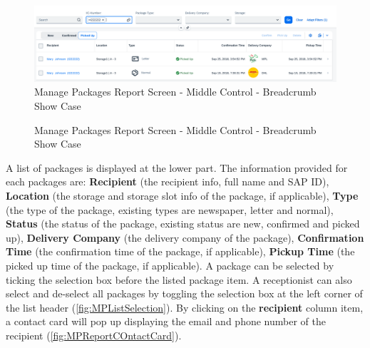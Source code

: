 \begin{figure}[H]
	\centering
	\includegraphics[width=1\linewidth]{images/user_doc/managePack/ReportScreen/browse/defaultFreeTextIdUsage.png}
	\caption{Manage Packages Report Screen - Middle Control - Breadcrumb Show Case}
	\label{fig:MPbreadcrumbShowCase}
\end{figure}


\begin{figure}[H]
	\centering
	\hspace{5pt}

	\caption{Manage Packages Report Screen - Middle Control - Breadcrumb Show Case}
	\label{fig:MPBreadCrumb}
\end{figure}

A list of packages is displayed at the lower part. The information provided for each packages are: \textbf{Recipient} (the recipient info, full name and SAP ID), \textbf{Location} (the storage and storage slot info of the package, if applicable), \textbf{Type} (the type of the package, existing types are newspaper, letter and normal), \textbf{Status} (the status of the package, existing status are new, confirmed and picked up), \textbf{Delivery Company} (the delivery company of the package), \textbf{Confirmation Time} (the confirmation time of the package, if applicable), \textbf{Pickup Time} (the picked up time of the package, if applicable).
A package can be selected by ticking the selection box before the listed package item. A receptionist can also select and de-select all packages by toggling the selection box at the left corner of the list header (\autoref{fig:MPListSelection}).
By clicking on the \textbf{recipient} column item, a contact card will pop up displaying  the email and phone number of the recipient (\autoref{fig:MPReportCOntactCard}).

